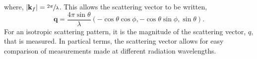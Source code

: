 %
where, $|\mathbf{k}_f| = \sfrac{2\pi}{\lambda}$. This allows the scattering vector to be written,
%
\begin{equation}
	\mathbf{q} = \frac{4\pi\sin{\theta}}{\lambda}(-\cos{\theta}\cos{\phi}, -\cos{\theta}\sin{\phi},\sin{\theta}).
\end{equation}
%
For an isotropic scattering pattern, it is the magnitude of the scattering vector, $q$, that is measured. In partical terms, the scattering vector allows for easy comparison of measurements made at different radiation wavelengths.
